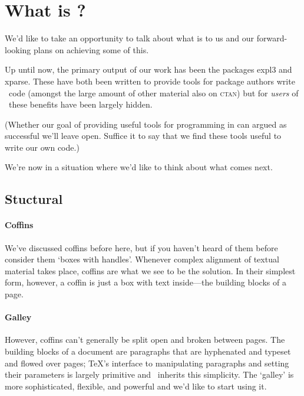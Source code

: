 \documentclass{ltnews}
\providecommand\acro[1]{\textsc{\MakeLowercase{#1}}}
\begin{document}
  \renewcommand{\TeaTeXNews}{\TeaTeX~News}
  \RaggedRight
  \setlength\parindent{1.5em}

\maketitle

\section{What is \TeaTeX?}

We'd like to take an opportunity to talk about what \TeaTeX is to us and our forward-looking plans on achieving some of this.

Up until now, the primary output of our \TeaTeX work has been the packages \textsf{expl3} and \textsf{xparse}.
These have both been written to provide tools for package authors write \LaTeXe\ code (amongst the large amount of other material also on \acro{CTAN}) but for \emph{users} of \TeaTeX\ these benefits have been largely hidden.

(Whether our goal of providing useful tools for programming in can argued as successful we'll leave open.
Suffice it to say that we find these tools useful to write our own code.)

We're now in a situation where we'd like to think about what comes next.

\subsection{Stuctural}

\paragraph{Coffins}

We've discussed coffins before here, but if you haven't heard of them before consider them `boxes with handles'.
Whenever complex alignment of textual material takes place, coffins are what we see to be the solution.
In their simplest form, however, a coffin is just a box with text inside---the building blocks of a page.

\paragraph{Galley}

However, coffins can't generally be split open and broken between pages. The building blocks of a document are paragraphs that are hyphenated and typeset and flowed over pages; \TeX's interface to manipulating paragraphs and setting their parameters is largely primitive and \LaTeXe\ inherits this simplicity.
The \TeaTeX `galley' is more sophisticated, flexible, and powerful and we'd like to start using it.
\end{document}
